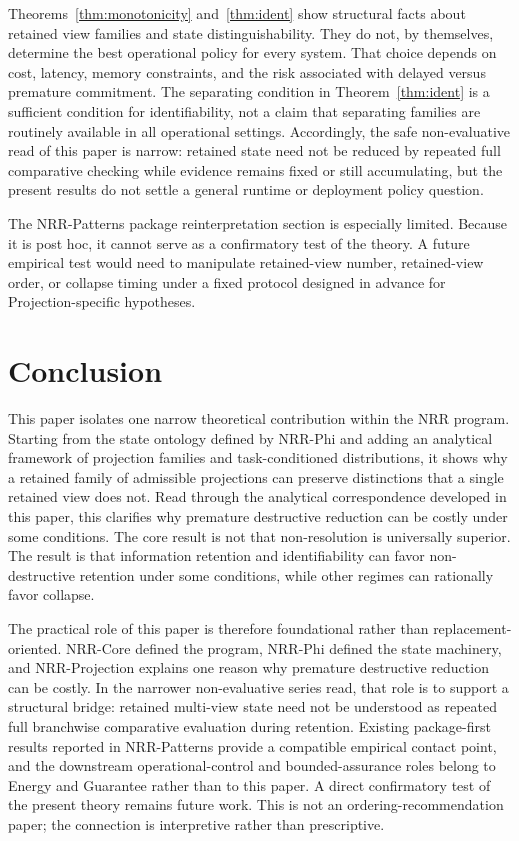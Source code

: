 \documentclass[11pt,a4paper]{article}
\begin{document}
Theorems~\ref{thm:monotonicity} and~\ref{thm:ident} show structural facts about retained view families and state distinguishability. They do not, by themselves, determine the best operational policy for every system. That choice depends on cost, latency, memory constraints, and the risk associated with delayed versus premature commitment.
The separating condition in Theorem~\ref{thm:ident} is a sufficient condition for identifiability, not a claim that separating families are routinely available in all operational settings.
Accordingly, the safe non-evaluative read of this paper is narrow: retained state need not be reduced by repeated full comparative checking while evidence remains fixed or still accumulating, but the present results do not settle a general runtime or deployment policy question.

The NRR-Patterns package reinterpretation section is especially limited. Because it is post hoc, it cannot serve as a confirmatory test of the theory. A future empirical test would need to manipulate retained-view number, retained-view order, or collapse timing under a fixed protocol designed in advance for Projection-specific hypotheses.

\section{Conclusion}
\label{sec:conclusion}

This paper isolates one narrow theoretical contribution within the NRR program. Starting from the state ontology defined by NRR-Phi \cite{saito2026phi} and adding an analytical framework of projection families and task-conditioned distributions, it shows why a retained family of admissible projections can preserve distinctions that a single retained view does not. Read through the analytical correspondence developed in this paper, this clarifies why premature destructive reduction can be costly under some conditions. The core result is not that non-resolution is universally superior. The result is that information retention and identifiability can favor non-destructive retention under some conditions, while other regimes can rationally favor collapse.

The practical role of this paper is therefore foundational rather than replacement-oriented. NRR-Core \cite{saito2025nrr} defined the program, NRR-Phi \cite{saito2026phi} defined the state machinery, and NRR-Projection explains one reason why premature destructive reduction can be costly. In the narrower non-evaluative series read, that role is to support a structural bridge: retained multi-view state need not be understood as repeated full branchwise comparative evaluation during retention. Existing package-first results reported in NRR-Patterns \cite{saito2026patterns} provide a compatible empirical contact point, and the downstream operational-control and bounded-assurance roles belong to Energy and Guarantee rather than to this paper. A direct confirmatory test of the present theory remains future work. This is not an ordering-recommendation paper; the connection is interpretive rather than prescriptive.
\end{document}
